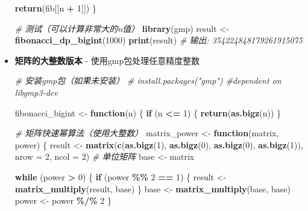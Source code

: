\documentclass[
  twoside]{book}
\newenvironment{Shaded}{\begin{snugshade}}{\end{snugshade}}
\newcommand{\AttributeTok}[1]{\textcolor[rgb]{0.13,0.29,0.53}{#1}}
\newcommand{\CommentTok}[1]{\textcolor[rgb]{0.56,0.35,0.01}{\textit{#1}}}
\newcommand{\ControlFlowTok}[1]{\textcolor[rgb]{0.13,0.29,0.53}{\textbf{#1}}}
\newcommand{\DecValTok}[1]{\textcolor[rgb]{0.00,0.00,0.81}{#1}}
\newcommand{\FunctionTok}[1]{\textcolor[rgb]{0.13,0.29,0.53}{\textbf{#1}}}
\newcommand{\NormalTok}[1]{#1}
\newcommand{\OtherTok}[1]{\textcolor[rgb]{0.56,0.35,0.01}{#1}}
\newcommand{\SpecialCharTok}[1]{\textcolor[rgb]{0.81,0.36,0.00}{\textbf{#1}}}
\begin{document}
\begin{itemize}
\begin{Shaded}
\begin{Highlighting}[]
  \FunctionTok{return}\NormalTok{(fib[[n }\SpecialCharTok{+} \DecValTok{1}\NormalTok{]])}
\NormalTok{\}}

\CommentTok{\# 测试（可以计算非常大的n值）}
\FunctionTok{library}\NormalTok{(gmp)}
\NormalTok{result }\OtherTok{\textless{}{-}} \FunctionTok{fibonacci\_dp\_bigint}\NormalTok{(}\DecValTok{1000}\NormalTok{)}
\FunctionTok{print}\NormalTok{(result)  }\CommentTok{\# 输出: 354224848179261915075}
\end{Highlighting}
\end{Shaded}
\item
  \textbf{矩阵的大整数版本} - 使用gmp包处理任意精度整数

\begin{Shaded}
\begin{Highlighting}[]
\CommentTok{\# 安装gmp包（如果未安装）}
\CommentTok{\# install.packages("gmp") \#dependent on libgmp3{-}dev}

\NormalTok{fibonacci\_bigint }\OtherTok{\textless{}{-}} \ControlFlowTok{function}\NormalTok{(n) \{}
  \ControlFlowTok{if}\NormalTok{ (n }\SpecialCharTok{\textless{}=} \DecValTok{1}\NormalTok{) \{}
    \FunctionTok{return}\NormalTok{(}\FunctionTok{as.bigz}\NormalTok{(n))}
\NormalTok{  \}}

  \CommentTok{\# 矩阵快速幂算法（使用大整数）}
\NormalTok{  matrix\_power }\OtherTok{\textless{}{-}} \ControlFlowTok{function}\NormalTok{(matrix, power) \{}
\NormalTok{    result }\OtherTok{\textless{}{-}} \FunctionTok{matrix}\NormalTok{(}\FunctionTok{c}\NormalTok{(}\FunctionTok{as.bigz}\NormalTok{(}\DecValTok{1}\NormalTok{), }\FunctionTok{as.bigz}\NormalTok{(}\DecValTok{0}\NormalTok{), }\FunctionTok{as.bigz}\NormalTok{(}\DecValTok{0}\NormalTok{), }\FunctionTok{as.bigz}\NormalTok{(}\DecValTok{1}\NormalTok{)),}
                    \AttributeTok{nrow =} \DecValTok{2}\NormalTok{, }\AttributeTok{ncol =} \DecValTok{2}\NormalTok{)  }\CommentTok{\# 单位矩阵}
\NormalTok{    base }\OtherTok{\textless{}{-}}\NormalTok{ matrix}

    \ControlFlowTok{while}\NormalTok{ (power }\SpecialCharTok{\textgreater{}} \DecValTok{0}\NormalTok{) \{}
      \ControlFlowTok{if}\NormalTok{ (power }\SpecialCharTok{\%\%} \DecValTok{2} \SpecialCharTok{==} \DecValTok{1}\NormalTok{) \{}
\NormalTok{        result }\OtherTok{\textless{}{-}} \FunctionTok{matrix\_multiply}\NormalTok{(result, base)}
\NormalTok{      \}}
\NormalTok{      base }\OtherTok{\textless{}{-}} \FunctionTok{matrix\_multiply}\NormalTok{(base, base)}
\NormalTok{      power }\OtherTok{\textless{}{-}}\NormalTok{ power }\SpecialCharTok{\%/\%} \DecValTok{2}
\NormalTok{    \}}


\end{Highlighting}
\end{Shaded}
\end{itemize}
\end{document}
